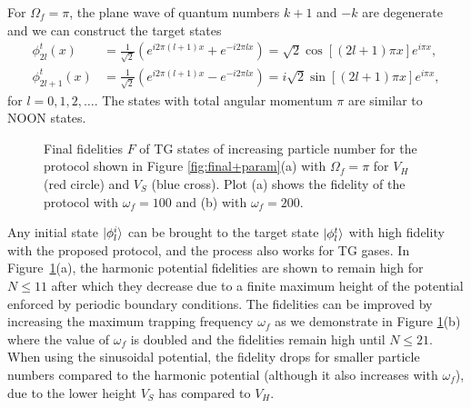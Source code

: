 For $\Omega_f=\pi$, the plane wave of quantum numbers $k+1$ and $-k$ are degenerate and we can construct the target states
\begin{align}
\phi^t_{2l}(x)&=\frac{1}{\sqrt 2} \left( e^{i 2 \pi (l+1) x} + e^{-i 2 \pi l x} \right) = \sqrt{2} \cos[(2l+1) \pi x] e^{i \pi x} , \\
\phi^t_{2l+1}(x)&=\frac{1}{\sqrt 2} \left( e^{i 2 \pi (l+1) x}-e^{-i 2 \pi l x} \right) = i \sqrt{2} \sin[(2l+1) \pi x]e^{i \pi x} ,
\end{align}
for $l=0,1,2,\ldots$.
The states with total angular momentum $\pi$ are similar to NOON states.

\begin{figure}
\centering
{}
\caption{ Final fidelities $F$ of TG states of increasing particle number for the protocol shown in Figure \ref{fig:final+param}(a) with $\Omega_f = \pi$ for $V_H$ (red circle) and $V_S$ (blue cross). Plot (a) shows the fidelity of the protocol with $\omega_f = 100$ and (b) with $\omega_f = 200$.}
\label{fig:TG-STA}
\end{figure}

Any initial state $\ket{\phi^i_l}$ can be brought to the target state $\ket{\phi^t_l}$ with high fidelity with the proposed protocol, and the process also works for TG gases.
In Figure~\ref{fig:TG-STA}(a), the harmonic potential fidelities are shown to remain high for $N \leq 11$ after which they decrease due to a finite maximum height of the potential enforced by periodic boundary conditions.
The fidelities can be improved by increasing the maximum trapping frequency $\omega_f$ as we demonstrate in Figure \ref{fig:TG-STA}(b) where the value of $\omega_f$ is doubled and the fidelities remain high until $N \leq 21$.
When using the sinusoidal potential, the fidelity drops for smaller particle numbers compared to the  harmonic potential (although it also increases with $\omega_f$), due to the lower height $V_S$ has compared to $V_H$.

